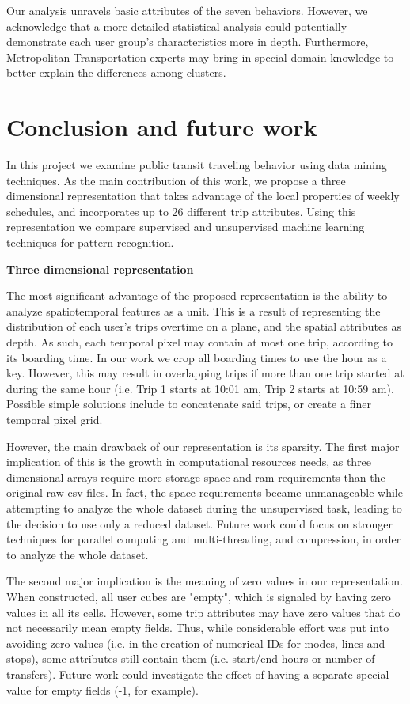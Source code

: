 \documentclass{article}
\begin{document}
Our analysis unravels basic attributes of the seven behaviors. However, we acknowledge that a more detailed statistical analysis could potentially demonstrate each user group's characteristics more in depth. Furthermore, Metropolitan Transportation experts may bring in special domain knowledge to better explain the differences among clusters. 
 

\newpage
\section{Conclusion and future work}
\label{sec:conclusion}
In this project we examine public transit traveling behavior using data mining techniques. As the main contribution of this work, we propose a three dimensional representation that takes advantage of the local properties of weekly schedules, and incorporates up to 26 different trip attributes. Using this representation we compare supervised and unsupervised machine learning techniques for pattern recognition. 

\textbf{Three dimensional representation}

The most significant advantage of the proposed representation is the ability to analyze spatiotemporal features as a unit. This is a result of representing the distribution of each user's trips overtime on a plane, and the spatial attributes as depth. As such, each temporal pixel may contain at most one trip, according to its boarding time. In our work we crop all boarding times to use the hour as a key. However, this may result in overlapping trips if more than one trip started at during the same hour (i.e. Trip 1 starts at 10:01 am, Trip 2 starts at 10:59 am). Possible simple solutions include to concatenate said trips, or create a finer temporal pixel grid. 

However, the main drawback of our representation is its sparsity. The first major implication of this is the growth in computational resources needs, as three dimensional arrays require more storage space and ram requirements than the original raw csv files. In fact, the space requirements became unmanageable while attempting to analyze the whole dataset during the unsupervised task, leading to the decision to use only a reduced dataset. Future work could focus on stronger techniques for parallel computing and multi-threading, and compression, in order to analyze the whole dataset. 

The second major implication is the meaning of zero values in our representation. When constructed, all user cubes are "empty", which is signaled by having zero values in all its cells. However, some trip attributes  may have zero values that do not necessarily mean empty fields. Thus, while considerable effort was put into avoiding zero values (i.e. in the creation of numerical IDs for modes, lines and stops), some attributes still contain them (i.e. start/end hours or number of transfers). Future work could investigate the effect of having a separate special value for empty fields (-1, for example).
\end{document}
